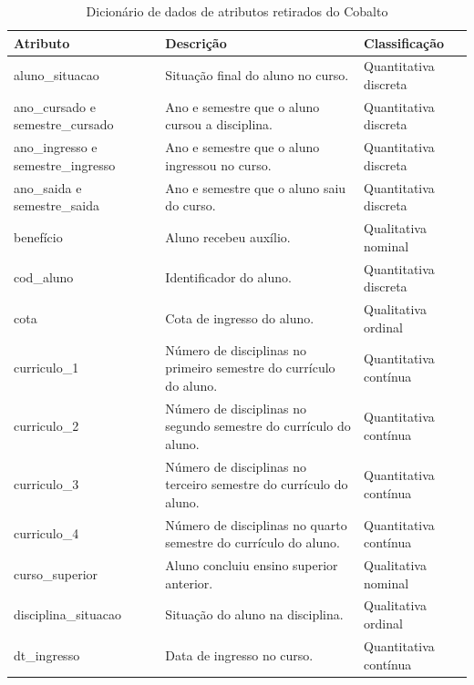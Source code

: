 \documentclass[diss,capa]{texufpel}
\begin{document}
       \begin{table}
            \begin{center}
                \caption{Dicionário de dados de atributos retirados do Cobalto}\label{dicionario-dados}
                \begin{tabular}{p{3cm}|p{8cm}|p{4cm}}
                    \hline
                    Atributo & Descrição & Classificação \\ \hline \hline
                    aluno\_situacao & Situação final do aluno no curso. & Quantitativa discreta \\ \hline
                    ano\_cursado e semestre\_cursado & Ano e semestre que o aluno cursou a disciplina. & Quantitativa discreta \\ \hline
                    ano\_ingresso e semestre\_ingresso & Ano e semestre que o aluno ingressou no curso. & Quantitativa discreta \\ \hline
                    ano\_saida e semestre\_saida & Ano e semestre que o aluno saiu do curso. & Quantitativa discreta \\ \hline
                    benefício & Aluno recebeu auxílio. & Qualitativa nominal \\ \hline
                    cod\_aluno & Identificador do aluno. & Quantitativa discreta \\ \hline
                    cota & Cota de ingresso do aluno. & Qualitativa ordinal \\ \hline
                    curriculo\_1 & Número de disciplinas no primeiro semestre do currículo do aluno. & Quantitativa contínua \\ \hline
                    curriculo\_2 & Número de disciplinas no segundo semestre do currículo do aluno. & Quantitativa contínua \\ \hline
                    curriculo\_3 & Número de disciplinas no terceiro semestre do currículo do aluno. & Quantitativa contínua \\ \hline
                    curriculo\_4 & Número de disciplinas no quarto semestre do currículo do aluno. & Quantitativa contínua \\ \hline
                    curso\_superior & Aluno concluiu ensino superior anterior. & Qualitativa nominal \\ \hline
                    disciplina\_situacao & Situação do aluno na disciplina. & Qualitativa ordinal \\ \hline
                    dt\_ingresso & Data de ingresso no curso. & Quantitativa contínua \\ \hline

\end{tabular}
\end{center}
\end{table}
\end{document}
